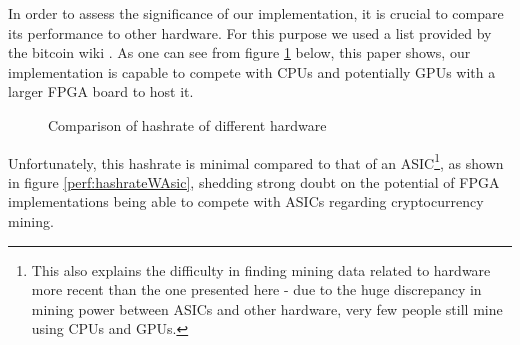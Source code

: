 In order to assess the significance of our implementation, it is crucial to compare its performance to other hardware. For this purpose we used a list provided by the bitcoin wiki\cite{bitcoinNonSpecializedHardware} \cite{bitcoinHardware}. As one can see from figure \ref{perf:hashrate} below, this paper shows, our implementation is capable to compete with CPUs and potentially GPUs with a larger FPGA board to host it. 
\begin{figure}
\centering

\caption{Comparison of hashrate of different hardware\label{perf:hashrate}}
\end{figure}
Unfortunately, this hashrate is minimal compared to that of an ASIC\footnote{This also explains the difficulty in finding mining data related to hardware more recent than the one presented here - due to the huge discrepancy in mining power between ASICs and other hardware, very few people still mine using CPUs and GPUs.}, as shown in figure \ref{perf:hashrateWAsic}, shedding strong doubt on the potential of FPGA implementations being able to compete with ASICs regarding cryptocurrency mining. 
